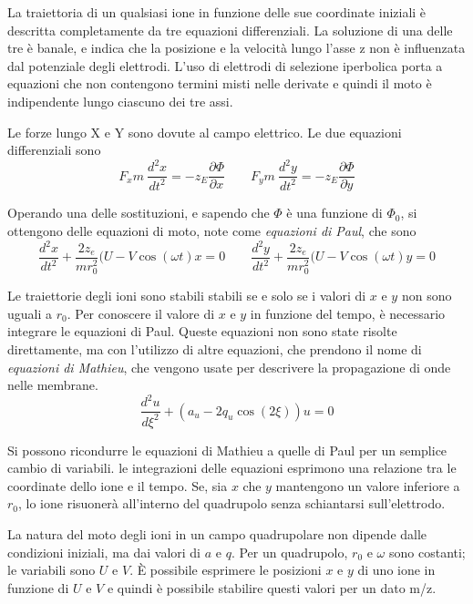 La traiettoria di un qualsiasi ione in funzione delle sue coordinate iniziali è descritta completamente da tre equazioni differenziali.
La soluzione di una delle tre è banale, e indica che la posizione e la velocità lungo l'asse z non è influenzata dal potenziale degli elettrodi.
L'uso di elettrodi di selezione iperbolica porta a equazioni che non contengono termini misti nelle derivate e quindi il moto è indipendente lungo ciascuno dei tre assi.

Le forze lungo X e Y sono dovute al campo elettrico. Le due equazioni differenziali sono
\[
F_x m \: \frac{d^2 x}{dt^2} = - z_E \frac{\partial \Phi}{\partial x} \qquad F_y m \: \frac{d^2 y}{dt^2} = - z_E \frac{\partial \Phi}{\partial y}
\]

Operando una delle sostituzioni, e sapendo che $\Phi$ è una funzione di $\Phi_0$, si ottengono delle equazioni di moto, note come \emph{equazioni di Paul}, che sono
\[
\frac{d^2 x}{dt^2} + \frac{2 z_e}{m r_0^2} (U - V \cos ( \omega t) x = 0 \qquad \frac{d^2 y}{dt^2} + \frac{2 z_e}{m r_0^2} (U - V \cos ( \omega t) y = 0 
\]

Le traiettorie degli ioni sono stabili stabili se e solo se i valori di $x$ e $y$ non sono uguali a $r_0$.
Per conoscere il valore di $x$ e $y$ in funzione del tempo, è necessario integrare le equazioni di Paul.
Queste equazioni non sono state risolte direttamente, ma con l'utilizzo di altre equazioni, che prendono il nome di \emph{equazioni di Mathieu}, che vengono usate per descrivere la propagazione di onde nelle membrane.
\[
\frac{d^2 u}{d \xi^2} + (a_u - 2q_u \cos (2\xi))u = 0
\]

Si possono ricondurre le equazioni di Mathieu a quelle di Paul per un semplice cambio di variabili.
le integrazioni delle equazioni esprimono una relazione tra le coordinate dello ione e il tempo.
Se, sia $x$ che $y$ mantengono un valore inferiore a $r_0$, lo ione risuonerà all'interno del quadrupolo senza schiantarsi sull'elettrodo.


La natura del moto degli ioni in un campo quadrupolare non dipende dalle condizioni iniziali, ma dai valori di $a$ e $q$.
Per un quadrupolo, $r_0$ e $\omega$ sono costanti; le variabili sono $U$ e $V$.
È possibile esprimere le posizioni $x$ e $y$ di uno ione in funzione di $U$ e $V$ e quindi è possibile stabilire questi valori per un dato m/z.


